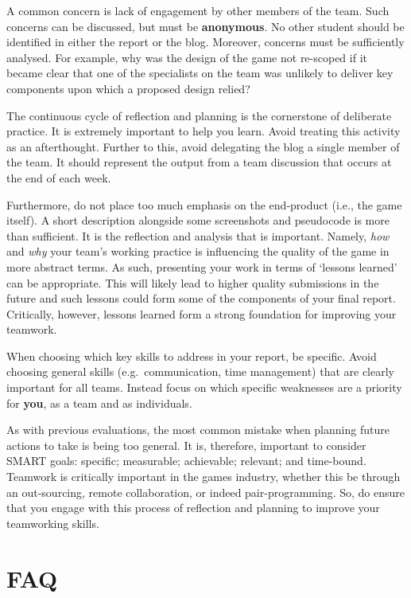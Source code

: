 \documentclass{../fal_assignment}
\begin{document}
A common concern is lack of engagement by other members of the team. Such concerns can be discussed, but must be \textbf{anonymous}. No other student should be identified in either the report or the blog. Moreover, concerns must be sufficiently analysed. For example, why was the design of the game not re-scoped if it became clear that one of the specialists on the team was unlikely to deliver key components upon which a proposed design relied?

The continuous cycle of reflection and planning is the cornerstone of deliberate practice. It is extremely important to help you learn. Avoid treating this activity as an afterthought. Further to this, avoid delegating the blog a single member of the team. It should represent the output from a team discussion that occurs at the end of each week. 

Furthermore, do not place too much emphasis on the end-product (i.e., the game itself). A short description alongside some screenshots and pseudocode is more than sufficient. It is the reflection and analysis that is important. Namely, \textit{how} and \textit{why} your team's working practice is influencing the quality of the game in more abstract terms. As such, presenting your work in terms of `lessons learned' can be appropriate. This will likely lead to higher quality submissions in the future and such lessons could form some of the components of your final report. Critically, however, lessons learned form a strong foundation for improving your teamwork.

When choosing which key skills to address in your report, be specific.
Avoid choosing general skills (e.g.\ communication, time management) that are clearly important for all teams.
Instead focus on which specific weaknesses are a priority for \textbf{you}, as a team and as individuals.

As with previous evaluations, the most common mistake when planning future actions to take is being too general. It is, therefore, important to consider SMART goals: specific; measurable; achievable; relevant; and time-bound. Teamwork is critically important in the games industry, whether this be through an out-sourcing, remote collaboration, or indeed pair-programming. So, do ensure that you engage with this process of reflection and planning to improve your teamworking skills.

\section*{FAQ}
\end{document}
